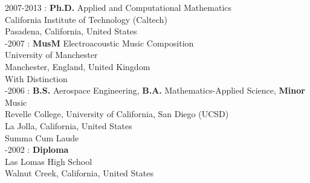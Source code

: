 2007-2013 : \textbf{Ph.D.} Applied and Computational Mathematics\\
California Institute of Technology (Caltech)\\
Pasadena, California, United States \\

-2007 : \textbf{MusM} Electroacoustic Music Composition\\
University of Manchester\\
Manchester, England, United Kingdom\\
With Distinction \\

-2006 : \textbf{B.S.} Aerospace Engineering, \textbf{B.A.} Mathematics-Applied Science, \textbf{Minor} Music\\
Revelle College, University of California, San Diego (UCSD)\\
La Jolla, California, United States\\
Summa Cum Laude\\

-2002 : \textbf{Diploma}\\
Las Lomas High School\\
Walnut Creek, California, United States
